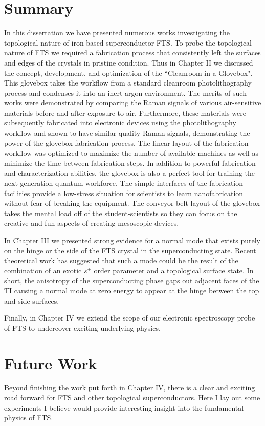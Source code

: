 \section{Summary}
In this dissertation we have presented numerous works investigating the topological nature of iron-based superconductor \acl{FTS}. To probe the topological nature of \ac{FTS} we required a fabrication process that consistently left the surfaces and edges of the crystals in pristine condition. Thus in Chapter II we discussed the concept, development, and optimization of the ``Cleanroom-in-a-Glovebox". This glovebox takes the workflow from a standard cleanroom photolithography process and condenses it into an inert argon environment. The merits of such works were demonstrated by comparing the Raman signals of various air-sensitive materials before and after exposure to air. Furthermore, these materials were subsequently fabricated into electronic devices using the photolithography workflow and shown to have similar quality Raman signals, demonstrating the power of the glovebox fabrication process. The linear layout of the fabrication workflow was optimized to maximize the number of available machines as well as minimize the time between fabrication steps. In addition to powerful fabrication and characterization abilities, the glovebox is also a perfect tool for training the next generation quantum workforce. The simple interfaces of the fabrication facilities provide a low-stress situation for scientists to learn nanofabrication without fear of breaking the equipment. The conveyor-belt layout of the glovebox takes the mental load off of the student-scientists so they can focus on the creative and fun aspects of creating mesoscopic devices.\par
In Chapter III we presented strong evidence for a normal mode that exists purely on the hinge or the side of the \ac{FTS} crystal in the superconducting state. Recent theoretical work has suggested that such a mode could be the result of the combination of an exotic $s^{\pm}$ order parameter and a topological surface state. In short, the anisotropy of the superconducting phase gaps out adjacent faces of the \ac{TI} causing a normal mode at zero energy to appear at the hinge between the top and side surfaces. 
\par
Finally, in Chapter IV we extend the scope of our electronic spectroscopy probe of \ac{FTS} to undercover exciting underlying physics. 

\section{Future Work}
Beyond finishing the work put forth in Chapter IV, there is a clear and exciting road forward for \ac{FTS} and other topological superconductors. Here I lay out some experiments I believe would provide interesting insight into the fundamental physics of \ac{FTS}.
